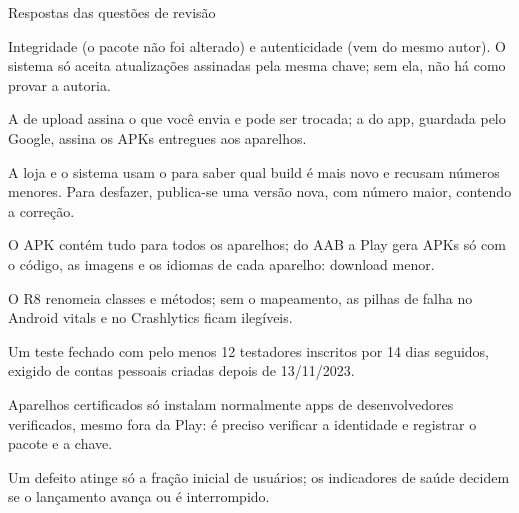 \documentclass[aspectratio=169,10pt]{beamer}
\begin{document}
\begin{frame}{Respostas das questões de revisão}
  \begin{respostas}
    \item Integridade (o pacote não foi alterado) e autenticidade (vem do mesmo autor). O sistema só aceita atualizações assinadas pela mesma chave; sem ela, não há como provar a autoria.
    \item A de upload assina o que você envia e pode ser trocada; a do app, guardada pelo Google, assina os APKs entregues aos aparelhos.
    \item A loja e o sistema usam o  para saber qual build é mais novo e recusam números menores. Para desfazer, publica-se uma versão nova, com número maior, contendo a correção.
    \item O APK contém tudo para todos os aparelhos; do AAB a Play gera APKs só com o código, as imagens e os idiomas de cada aparelho: download menor.
    \item O R8 renomeia classes e métodos; sem o mapeamento, as pilhas de falha no Android vitals e no Crashlytics ficam ilegíveis.
    \item Um teste fechado com pelo menos 12 testadores inscritos por 14 dias seguidos, exigido de contas pessoais criadas depois de 13/11/2023.
    \item Aparelhos certificados só instalam normalmente apps de desenvolvedores verificados, mesmo fora da Play: é preciso verificar a identidade e registrar o pacote e a chave.
    \item Um defeito atinge só a fração inicial de usuários; os indicadores de saúde decidem se o lançamento avança ou é interrompido.
  \end{respostas}
\end{frame}

\end{document}
